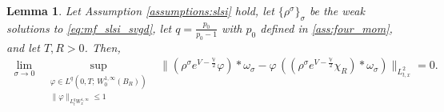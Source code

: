 \documentclass[reqno, 11pt]{amsart}
\numberwithin{equation}{section}
\newtheorem{lem}[thm]{Lemma}
\theoremstyle{definition}
\begin{document}
\begin{lem}\label{lem:comm_est_slsi}
    Let Assumption \ref{assumptions:slsi} hold, let $\{\rho^\sigma\}_\sigma$ be the weak solutions to \eqref{eq:mf_slsi_svgd}, let $q=\frac{p_0}{p_0-1}$ with $p_0$ defined in \ref{ass:four_mom}, and let $T,R>0$. Then,
    \begin{align}
        \label{eq:conv_com_slsi}
        \lim_{\sigma\to 0}\;\;
        \sup_{\substack{\varphi\in L^q(0,T;\, W_0^{1,\infty}(B_R)) \\ \|\varphi\|_{ L_t^q W_x^{1,\infty}}\leq 1}}\;\;
        \|(\rho^\sigma e^{V-\frac{\mathbb{V}}{2}}\varphi)\ast\omega_\sigma
        -\varphi\,((\rho^\sigma e^{V-\frac{\mathbb{V}}{2}}\chi_R)\ast\omega_\sigma)\|_{L_{t,x}^2}
        =0.
    \end{align}
\end{lem}
\end{document}
